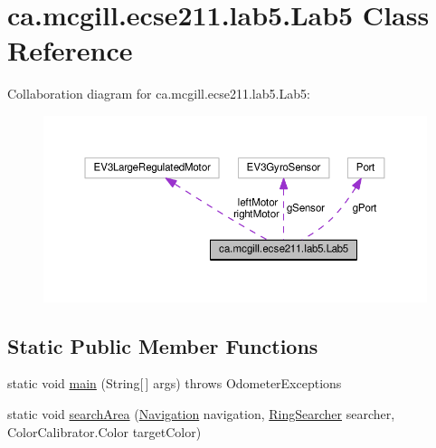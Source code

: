 \hypertarget{classca_1_1mcgill_1_1ecse211_1_1lab5_1_1_lab5}{}\section{ca.\+mcgill.\+ecse211.\+lab5.\+Lab5 Class Reference}
\label{classca_1_1mcgill_1_1ecse211_1_1lab5_1_1_lab5}


Collaboration diagram for ca.\+mcgill.\+ecse211.\+lab5.\+Lab5\+:
\nopagebreak
\begin{figure}[H]
\begin{center}
\leavevmode
\includegraphics[width=350pt]{classca_1_1mcgill_1_1ecse211_1_1lab5_1_1_lab5__coll__graph}
\end{center}
\end{figure}
\subsection*{Static Public Member Functions}
\begin{DoxyCompactItemize}
\item 
static void \hyperlink{classca_1_1mcgill_1_1ecse211_1_1lab5_1_1_lab5_a82cca51f550ed0eb016bb2082d3fe755}{main} (String\mbox{[}$\,$\mbox{]} args)  throws Odometer\+Exceptions 
\item 
static void \hyperlink{classca_1_1mcgill_1_1ecse211_1_1lab5_1_1_lab5_a0e80ac0068ef1ab41cfb571b8c65845c}{search\+Area} (\hyperlink{classca_1_1mcgill_1_1ecse211_1_1lab5_1_1_navigation}{Navigation} navigation, \hyperlink{classca_1_1mcgill_1_1ecse211_1_1lab5_1_1_ring_searcher}{Ring\+Searcher} searcher, Color\+Calibrator.\+Color target\+Color)
\end{DoxyCompactItemize}
